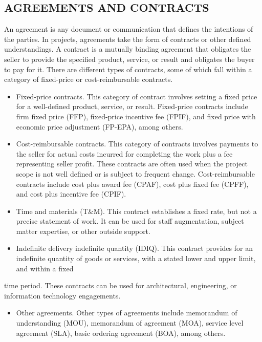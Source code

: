 \documentclass[11pt]{article}
\begin{document}
\subsection{AGREEMENTS AND CONTRACTS}
\label{sec:org46a18cc}
An agreement is any document or communication that defines the intentions of the parties. In projects, agreements take the form of contracts or other defined understandings. A contract is
a mutually binding agreement that obligates the seller to provide the specified product, service, or result and obligates the buyer to pay for it. There are different types of contracts, some of which fall within a category of fixed-price or cost-reimbursable contracts.
\begin{itemize}
\item Fixed-price contracts. This category of contract involves setting a fixed price for a well-defined product, service, or result. Fixed-price contracts include firm fixed price (FFP), fixed-price incentive fee (FPIF), and fixed price with economic price adjustment (FP-EPA), among others.
\item Cost-reimbursable contracts. This category of contracts involves payments to the seller for actual costs incurred for completing the work plus a fee representing seller profit. These contracts are often used when the project scope is not well defined or is subject to frequent change. Cost-reimbursable contracts include cost plus award fee (CPAF), cost plus fixed fee (CPFF), and cost plus incentive fee (CPIF).
\item Time and materials (T\&M). This contract establishes a fixed rate, but not a precise statement of work. It can be used for staff augmentation, subject matter expertise, or other outside support.
\item Indefinite delivery indefinite quantity (IDIQ). This contract provides for an indefinite quantity of goods or services, with a stated lower and upper limit, and within a fixed
\end{itemize}
time period. These contracts can be used for architectural, engineering, or information technology engagements.
\begin{itemize}
\item Other agreements. Other types of agreements include memorandum of understanding (MOU), memorandum of agreement (MOA), service level agreement (SLA), basic ordering agreement (BOA), among others.
\end{itemize}
\end{document}
